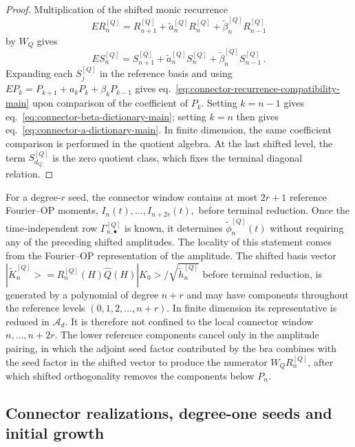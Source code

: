 \documentclass[a4paper,11pt]{article}
\def\ket#1{|#1>}%
\theoremstyle{definition}
\theoremstyle{remark}
\newcommand{\ket}[1]{|#1\rangle}
\newcommand{\cA}{\mathcal A}
\newcommand{\tphi}{\widetilde\phi}
\newcommand{\thh}{\widetilde h}
\newcommand{\Qhat}{\widehat Q}
\begin{document}
\begin{proof}
Multiplication of the shifted monic recurrence
\begin{equation}
   ER_n^{[Q]}
   =
   R_{n+1}^{[Q]}
   +\widetilde a_n^{[Q]}R_n^{[Q]}
   +\widetilde\beta_n^{[Q]}R_{n-1}^{[Q]}
\end{equation}
by $W_Q$ gives
\begin{equation}
   ES_n^{[Q]}
   =
   S_{n+1}^{[Q]}
   +\widetilde a_n^{[Q]}S_n^{[Q]}
   +\widetilde\beta_n^{[Q]}S_{n-1}^{[Q]}\,.
\end{equation}
Expanding each $S_j^{[Q]}$ in the reference basis and using
$
   EP_k=P_{k+1}+a_kP_k+\beta_kP_{k-1}
$
gives eq.~\eqref{eq:connector-recurrence-compatibility-main} upon comparison of the coefficient of $P_k$. Setting $k=n-1$ gives
eq.~\eqref{eq:connector-beta-dictionary-main}; setting $k=n$ then gives
eq.~\eqref{eq:connector-a-dictionary-main}. In finite dimension, the same coefficient comparison is performed in the quotient algebra. At the last shifted level, the term $S_{d_Q}^{[Q]}$ is the zero quotient class, which fixes the terminal diagonal relation.
\end{proof}

For a degree-$r$ seed, the connector window contains at most $2r+1$ reference Fourier--OP moments,
$
   I_n(t),\ldots,I_{n+2r}(t),
$
before terminal reduction. Once the time-independent row
$\Gamma_{n,\bullet}^{[Q]}$ is known, it determines
$\tphi_n^{[Q]}(t)$ without requiring any of the preceding shifted amplitudes. The locality of this statement comes from the Fourier--OP representation of the amplitude. The shifted basis vector
$
   \ket{\widetilde K_n^{[Q]}}
   =
   R_n^{[Q]}(H)\Qhat(H)\ket{K_0}/\sqrt{\thh_n^{[Q]}}
$
before terminal reduction, is generated by a polynomial of degree $n+r$ and may have components throughout the reference levels $(0,1,2,\ldots,n+r)$. In finite dimension its representative is reduced in $\cA_d$. It is therefore not confined to the local connector window $n,\ldots,n+2r$. The lower reference components cancel only in the amplitude pairing, in which the adjoint seed factor contributed by the bra combines with the seed factor in the shifted vector to produce the numerator $W_QR_n^{[Q]}$, after which shifted orthogonality removes the components below $P_n$.

\subsection{Connector realizations, degree-one seeds and initial growth}
\label{subsec:connector-realizations}
\end{document}
